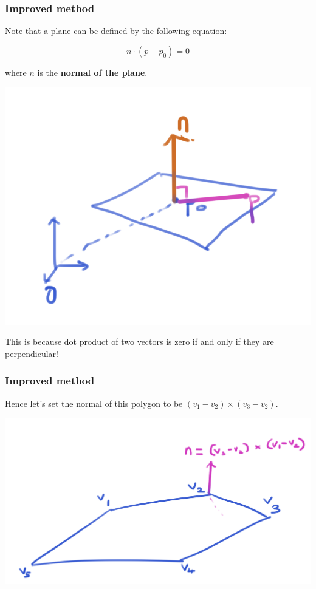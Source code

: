 \documentclass{beamer}
\begin{document}
\begin{frame}
    \frametitle{Improved method}

    Note that a plane can be defined by the following equation:

    $$
    n \cdot (p - p_0) = 0
    $$

    where $n$ is the \textbf{normal of the plane}. 

    \begin{center}
        \includegraphics[scale=0.3]{plane-def.png}
    \end{center}

    This is because dot product of two vectors is zero if and only if they are perpendicular!

\end{frame}

\begin{frame}
    \frametitle{Improved method}

    Hence let's set the normal of this polygon to be $(v_1 - v_2) \times (v_3 - v_2)$.

    \begin{center}
        \includegraphics[scale=0.25]{planar-m2.png}
    \end{center}

\end{frame}
\end{document}
